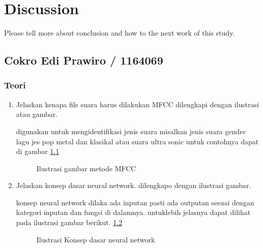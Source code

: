 \chapter{Discussion}
Please tell more about conclusion and how to the next work of this study.


\section{Cokro Edi Prawiro / 1164069}
\subsection{Teori}

\begin{enumerate}

\item Jelaskan kenapa file suara harus dilakukan MFCC dilengkapi dengan ilustrasi atau gambar.\par
digunakan untuk mengidentifikasi jenis suara misalkan jenis suara gendre lagu jes pop metal dan klasikal atau suara ultra sonic untuk contohnya dapat di gambar \ref{c113} 

\begin{figure}[!htbp]
      \caption{Ilustrasi gambar metode MFCC}
      \label{c113}
      \end{figure}

\item Jelaskan konsep dasar neural network. dilengkapo dengan ilustrasi gambar. \par
konsep neural network dilaka ada inputan pasti ada outputan sesuai dengan kategori inputan dan fungsi di dalamnya. untuklebih jelasnya dapat dilihat pada ilustrasi gambar berikut. \ref{c114}

\begin{figure}[!htbp]
      \caption{Ilustrasi Konsep dasar neural network}
      \label{c114}
      \end{figure}


\end{enumerate}

